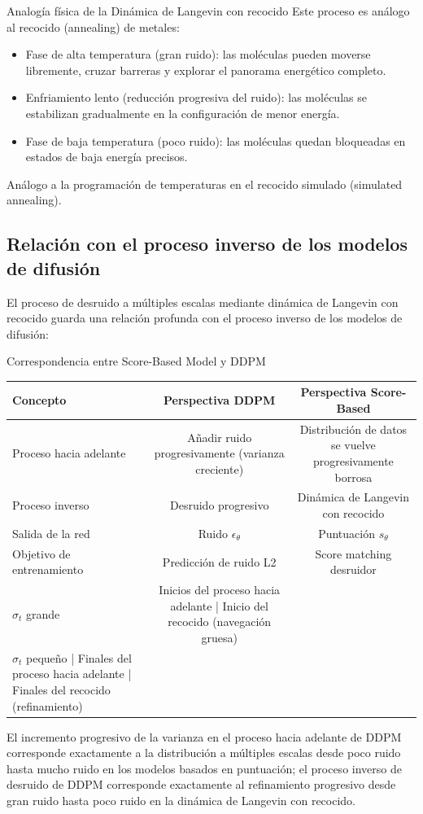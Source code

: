 \documentclass[a4paper]{article}
\begin{document}
\begin{knowledgebox}{Analogía física de la Dinámica de Langevin con recocido}
Este proceso es análogo al recocido (annealing) de metales:
\begin{itemize}
    \item Fase de alta temperatura (gran ruido): las moléculas pueden moverse libremente, cruzar barreras y explorar el panorama energético completo.
    \item Enfriamiento lento (reducción progresiva del ruido): las moléculas se estabilizan gradualmente en la configuración de menor energía.
    \item Fase de baja temperatura (poco ruido): las moléculas quedan bloqueadas en estados de baja energía precisos.
\end{itemize}
Análogo a la programación de temperaturas en el recocido simulado (simulated annealing).
\end{knowledgebox}

\subsection{Relación con el proceso inverso de los modelos de difusión}

El proceso de desruido a múltiples escalas mediante dinámica de Langevin con recocido guarda una relación profunda con el proceso inverso de los modelos de difusión:

\begin{importantbox}{Correspondencia entre Score-Based Model y DDPM}
\begin{center}
\begin{tabular}{lcc}
\toprule
\textbf{Concepto} & \textbf{Perspectiva DDPM} & \textbf{Perspectiva Score-Based} \\
\midrule
Proceso hacia adelante & Añadir ruido progresivamente (varianza creciente) & Distribución de datos se vuelve progresivamente borrosa \\
Proceso inverso & Desruido progresivo & Dinámica de Langevin con recocido \\
Salida de la red & Ruido $\epsilon_\theta$ & Puntuación $s_\theta$ \\
Objetivo de entrenamiento & Predicción de ruido L2 & Score matching desruidor \\
$\sigma_t$ grande & Inicios del proceso hacia adelante | Inicio del recocido (navegación gruesa) \\
$\sigma_t$ pequeño | Finales del proceso hacia adelante | Finales del recocido (refinamiento) \\
\bottomrule
\end{tabular}
\end{center}
El incremento progresivo de la varianza en el proceso hacia adelante de DDPM corresponde exactamente a la distribución a múltiples escalas desde poco ruido hasta mucho ruido en los modelos basados en puntuación; el proceso inverso de desruido de DDPM corresponde exactamente al refinamiento progresivo desde gran ruido hasta poco ruido en la dinámica de Langevin con recocido.
\end{importantbox}
\end{document}
